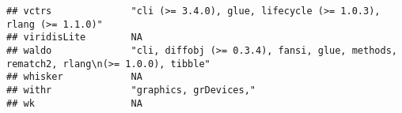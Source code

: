 \documentclass[
]{article}
\begin{document}
\begin{verbatim}
## vctrs              "cli (>= 3.4.0), glue, lifecycle (>= 1.0.3), rlang (>= 1.1.0)"                                                                                                                                                                                                                                                                                                                                                                               
## viridisLite        NA                                                                                                                                                                                                                                                                                                                                                                                                                                           
## waldo              "cli, diffobj (>= 0.3.4), fansi, glue, methods, rematch2, rlang\n(>= 1.0.0), tibble"                                                                                                                                                                                                                                                                                                                                                         
## whisker            NA                                                                                                                                                                                                                                                                                                                                                                                                                                           
## withr              "graphics, grDevices,"                                                                                                                                                                                                                                                                                                                                                                                                                       
## wk                 NA                                                                                                                                                                                                                                                                                                                                                                                                                                           

\end{verbatim}
\end{document}
